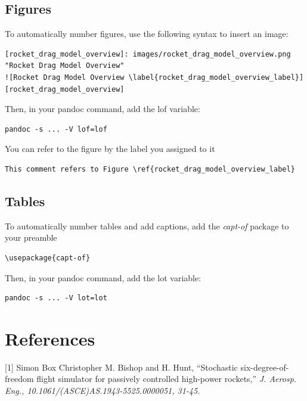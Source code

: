\documentclass[]{book}
\begin{document}
\section{Figures}\label{figures}

To automatically number figures, use the following syntax to insert an
image:

\begin{verbatim}
[rocket_drag_model_overview]: images/rocket_drag_model_overview.png "Rocket Drag Model Overview" 
![Rocket Drag Model Overview \label{rocket_drag_model_overview_label}][rocket_drag_model_overview] 
\end{verbatim}

Then, in your pandoc command, add the lof variable:

\begin{verbatim}
pandoc -s ... -V lof=lof
\end{verbatim}

You can refer to the figure by the label you assigned to it

\begin{verbatim}
This comment refers to Figure \ref{rocket_drag_model_overview_label}
\end{verbatim}

\section{Tables}\label{tables}

To automatically number tables and add captions, add the \emph{capt-of}
package to your preamble

\begin{verbatim}
\usepackage{capt-of}
\end{verbatim}

Then, in your pandoc command, add the lot variable:

\begin{verbatim}
pandoc -s ... -V lot=lot
\end{verbatim}

\chapter*{References}\label{references}

{[}1{]} Simon Box Christopher M. Bishop and H. Hunt, ``Stochastic
six-degree-of-freedom flight simulator for passively controlled
high-power rockets,'' \emph{J. Aerosp. Eng.,
10.1061/(ASCE)AS.1943-5525.0000051, 31-45.}
\end{document}
